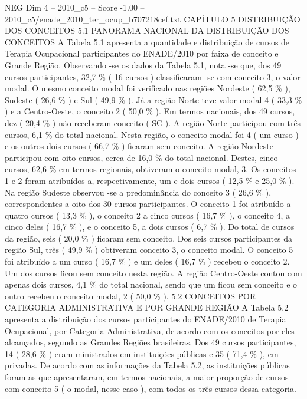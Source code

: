 \begin{textsample}{NEG Dim 4 – 2010\_c5 – Score -1.00 – 2010\_c5/enade\_2010\_ter\_ocup\_b707218cef.txt}  \label{ex:f4_neg_127}
CAPÍTULO 5 DISTRIBUIÇÃO DOS CONCEITOS 5.1 PANORAMA NACIONAL DA DISTRIBUIÇÃO DOS CONCEITOS A Tabela 5.1 apresenta a quantidade e distribuição de cursos de Terapia Ocupacional participantes do ENADE/2010 por faixa de conceito e Grande Região.
Observando -se os dados da Tabela 5.1, nota -se que, dos 49 cursos participantes, 32,7 \% ( 16 cursos ) classificaram -se com conceito 3, o valor modal.
O mesmo conceito modal foi verificado nas regiões Nordeste ( 62,5 \% ), Sudeste ( 26,6 \% ) e Sul ( 49,9 \% ).
Já a região Norte teve valor modal 4 ( 33,3 \% ) e a Centro-Oeste, o conceito 2 ( 50,0 \% ).
Em termos nacionais, dos 49 cursos, dez ( 20,4 \% ) não receberam conceito ( SC ).
A região Norte participou com três cursos, 6,1 \% do total nacional.
Nesta região, o conceito modal foi 4 ( um curso ) e os outros dois cursos ( 66,7 \% ) ficaram sem conceito.
A região Nordeste participou com oito cursos, cerca de 16,0 \% do total nacional.
Destes, cinco cursos, 62,6 \% em termos regionais, obtiveram o conceito modal, 3.
Os conceitos 1 e 2 foram atribuídos a, respectivamente, um e dois cursos ( 12,5 \% e 25,0 \% ).
Na região Sudeste observou -se a predominância do conceito 3 ( 26,6 \% ), correspondentes a oito dos 30 cursos participantes.
O conceito 1 foi atribuído a quatro cursos ( 13,3 \% ), o conceito 2 a cinco cursos ( 16,7 \% ), o conceito 4, a cinco deles ( 16,7 \% ), e o conceito 5, a dois cursos ( 6,7 \% ).
Do total de cursos da região, seis ( 20,0 \% ) ficaram sem conceito.
Dos seis cursos participantes da região Sul, três ( 49,9 \% ) obtiveram conceito 3, o conceito modal.
O conceito 5 foi atribuído a um curso ( 16,7 \% ) e um deles ( 16,7 \% ) recebeu o conceito 2.
Um dos cursos ficou sem conceito nesta região.
A região Centro-Oeste contou com apenas dois cursos, 4,1 \% do total nacional, sendo que um ficou sem conceito e o outro recebeu o conceito modal, 2 ( 50,0 \% ). 5.2 CONCEITOS POR CATEGORIA ADMINISTRATIVA E POR GRANDE REGIÃO A Tabela 5.2 apresenta a distribuição dos cursos participantes do ENADE/2010 de Terapia Ocupacional, por Categoria Administrativa, de acordo com os conceitos por eles alcançados, segundo as Grandes Regiões brasileiras.
Dos 49 cursos participantes, 14 ( 28,6 \% ) eram ministrados em instituições públicas e 35 ( 71,4 \% ), em privadas.
De acordo com as informações da Tabela 5.2, as instituições públicas foram as que apresentaram, em termos nacionais, a maior proporção de cursos com conceito 5 ( o modal, nesse caso ), com todos os três cursos dessa categoria.

\end{textsample}
